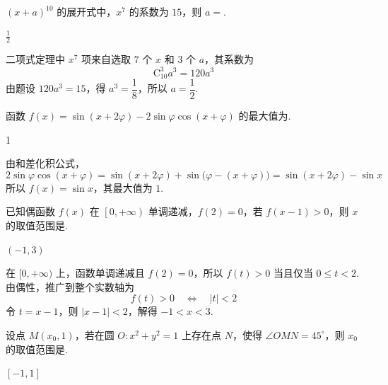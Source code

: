 \begin{problem}
\(\left(x+a\right)^{10}\) 的展开式中，\(x^7\) 的系数为 \(15\)，则 \(a=\)\fillinblank{}.
\end{problem}

\begin{answer}
\(\frac{1}{2}\)
\end{answer}

\begin{solution}
二项式定理中 \(x^7\) 项来自选取 \(7\) 个 \(x\) 和 \(3\) 个 \(a\)，其系数为
\[
\mathrm C_{10}^{3}a^3=120a^3
\]
由题设 \(120a^3=15\)，得 \(a^3=\dfrac18\)，所以 \(a=\dfrac12\).
\end{solution}

\begin{problem}
函数 \(f(x)=\sin\left(x+2\varphi\right)-2\sin\varphi\cos\left(x+\varphi\right)\) 的最大值为\fillinblank{}.
\end{problem}

\begin{answer}
1
\end{answer}

\begin{solution}
由和差化积公式，
\[
2\sin\varphi\cos(x+\varphi)
=\sin(x+2\varphi)+\sin\bigl(\varphi-(x+\varphi)\bigr)
=\sin(x+2\varphi)-\sin x
\]
所以 \(f(x)=\sin x\)，其最大值为 \(1\).
\end{solution}

\begin{problem}
已知偶函数 \(f(x)\) 在 \(\left[0,+\infty\right)\) 单调递减，\(f(2)=0\)，若 \(f(x-1)>0\)，则 \(x\) 的取值范围是\fillinblank{}.
\end{problem}

\begin{answer}
\((-1,3)\)
\end{answer}

\begin{solution}
在 \([0,+\infty)\) 上，函数单调递减且 \(f(2)=0\)，所以 \(f(t)>0\) 当且仅当 \(0\leqslant t<2\). 由偶性，推广到整个实数轴为
\[
f(t)>0\quad\Longleftrightarrow\quad |t|<2
\]
令 \(t=x-1\)，则 \(|x-1|<2\)，解得 \(-1<x<3\).
\end{solution}

\begin{problem}
设点 \(M(x_0,1)\)，若在圆 \(O:x^2+y^2=1\) 上存在点 \(N\)，使得 \(\angle OMN=45^{\circ}\)，则 \(x_0\) 的取值范围是\fillinblank{}.
\end{problem}

\begin{answer}
\([-1,1]\)
\end{answer}


